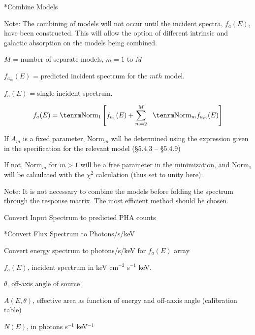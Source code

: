 {\list
 


}
 
\**Combine Models

{\list
Note: The combining of models will not occur until the incident spectra,
$f_a(E)$, have been constructed.  This will allow the option of
different intrinsic and galactic absorption on the models being
combined.


$M$ = number of separate models, $m=1$ to $M$

$f_{a_m}(E)$ = predicted incident spectrum for the $mth$ model.


$f_a(E)$ = single incident spectrum.


}

$$f_a(E) = {\rm Norm}_1 \left[ f_{a_1}(E) + \sum_{m=2}^{M}~~{\rm Norm}_m
 f_{a_m}(E) \right]$$ 

{\list

If $A_m$ is a fixed parameter, Norm$_{m}$ will be determined using the expression
given in the specification for the relevant model (\S 5.4.3 -- \S 5.4.9)

If not, Norm$_{m}$ for $m>1$ will be a free parameter in the minimization, and
Norm$_{1}$ will be calculated with the $\chi^{2}$ calculation (thus set to unity here).

Note: It is not necessary to combine the models before folding the
spectrum through the response matrix.  The most efficient method
should be chosen.

}

\@{Convert Input Spectrum to predicted PHA counts}
 
\**Convert Flux Spectrum to Photons/s/keV

{\list
 

Convert energy spectrum to photons/s/keV for $f_a(E)$ array
 

$f_a(E)$, incident spectrum in keV cm$^{-2}$ s$^{-1}$ keV.
 
$\theta$, off-axis angle of source

$A(E,\theta)$, effective area as function of energy and off-aaxis
angle (calibration table)
 

$N(E)$, in photons s$^{-1}$ keV$^{-1}$
 

}

